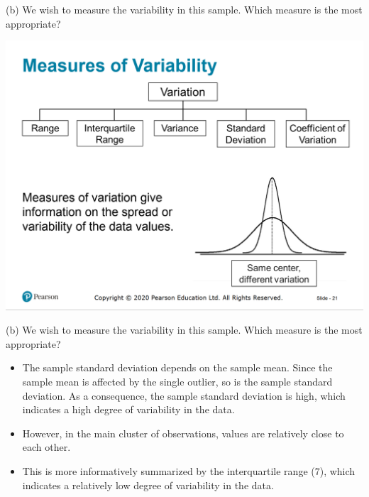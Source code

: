 \documentclass[
  11pt,
  ignorenonframetext,
]{beamer}
\begin{document}
\begin{frame}{(b) We wish to measure the variability in this sample.
\quad Which measure is the most appropriate?}
\protect\hypertarget{b-we-wish-to-measure-the-variability-in-this-sample.-which-measure-is-the-most-appropriate}{}
\pause

\begin{center}\includegraphics[width=0.8\linewidth]{pictures/Variability} \end{center}
\end{frame}

\begin{frame}{(b) We wish to measure the variability in this sample.
\quad Which measure is the most appropriate?}
\protect\hypertarget{b-we-wish-to-measure-the-variability-in-this-sample.-which-measure-is-the-most-appropriate-1}{}
\begin{itemize}
\item
  The sample standard deviation depends on the sample mean. Since the
  sample mean is affected by the single outlier, so is the sample
  standard deviation. As a consequence, the sample standard deviation is
  high, which indicates a high degree of variability in the data.
\item
  However, in the main cluster of observations, values are relatively
  close to each other.
\item
  This is more informatively summarized by the interquartile range
  (\(7\)), which indicates a relatively low degree of variability in the
  data.
\end{itemize}
\end{frame}
\end{document}
